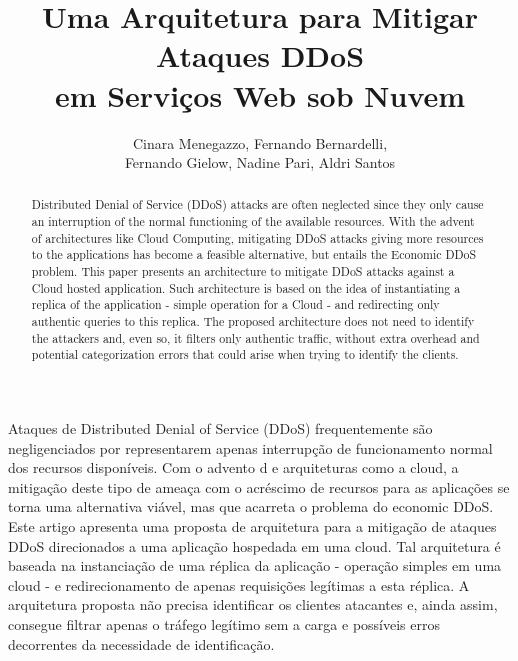 \documentclass[a4paper, 12pt]{article}
\begin{document}
\title{Uma Arquitetura para Mitigar Ataques DDoS\\ em Serviços Web sob Nuvem}


\author{
Cinara Menegazzo, Fernando Bernardelli, \\
Fernando Gielow, Nadine Pari, Aldri Santos
}
   
\address{Departamento de Informática -- Universidade Federal do Paraná\\
NR2 - Núcleo de Redes Sem Fio e Redes Avançadas -- Curitiba -- Brasil
}     

\maketitle


\begin{abstract}
Distributed Denial of Service (DDoS) attacks are often neglected since they only cause an interruption of the normal functioning of the available resources. 
With the advent of %
architectures like Cloud Computing, mitigating DDoS attacks giving more resources to the applications has become a feasible alternative, but entails the Economic DDoS problem. This paper presents an architecture to mitigate DDoS attacks against a Cloud hosted application. Such architecture is based on the idea of instantiating a replica of the application - simple operation for a Cloud - and redirecting only authentic queries to this replica. The proposed architecture does not need to identify the attackers and, even so, it filters only authentic traffic, without extra overhead and potential categorization errors that could arise when trying to identify the clients.
%
\end{abstract}

\begin{resumo}
Ataques de Distributed Denial of Service (DDoS) frequentemente são negligenciados por representarem apenas interrupção de funcionamento normal dos recursos disponíveis. 
Com o advento d%
e arquiteturas como a cloud, a mitigação deste tipo de ameaça com o acréscimo de recursos para as aplicações se torna uma alternativa viável, mas que acarreta o problema do economic DDoS. Este artigo apresenta uma proposta de arquitetura para a mitigação de ataques DDoS direcionados a uma aplicação hospedada em uma cloud. Tal arquitetura é baseada na instanciação de uma réplica da aplicação - operação simples em uma cloud - e redirecionamento de apenas requisições legítimas a esta réplica. A arquitetura proposta não precisa identificar os clientes atacantes e, ainda assim, consegue filtrar apenas o tráfego legítimo sem a carga e possíveis erros decorrentes da necessidade de identificação.
% 
\end{resumo}
\end{document}
